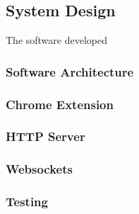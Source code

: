 \subsection{System Design}

The software developed 

\subsubsection{Software Architecture}

\subsubsection{Chrome Extension}

\subsubsection{HTTP Server}


\subsubsection{Websockets}

\subsubsection{Testing}





